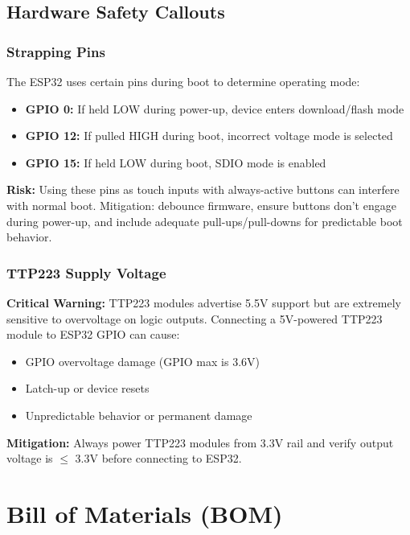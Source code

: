 \subsection{Hardware Safety Callouts}

\subsubsection{Strapping Pins}

The ESP32 uses certain pins during boot to determine operating mode:

\begin{itemize}
    \item \textbf{GPIO 0:} If held LOW during power-up, device enters download/flash mode
    \item \textbf{GPIO 12:} If pulled HIGH during boot, incorrect voltage mode is selected
    \item \textbf{GPIO 15:} If held LOW during boot, SDIO mode is enabled
\end{itemize}

\textbf{Risk:} Using these pins as touch inputs with always-active buttons can interfere with normal boot. Mitigation: debounce firmware, ensure buttons don't engage during power-up, and include adequate pull-ups/pull-downs for predictable boot behavior.

\subsubsection{TTP223 Supply Voltage}

\textbf{Critical Warning:} TTP223 modules advertise 5.5V support but are extremely sensitive to overvoltage on logic outputs. Connecting a 5V-powered TTP223 module to ESP32 GPIO can cause:

\begin{itemize}
    \item GPIO overvoltage damage (GPIO max is 3.6V)
    \item Latch-up or device resets
    \item Unpredictable behavior or permanent damage
\end{itemize}

\textbf{Mitigation:} Always power TTP223 modules from 3.3V rail and verify output voltage is \(\leq\) 3.3V before connecting to ESP32.



\section{Bill of Materials (BOM)}

